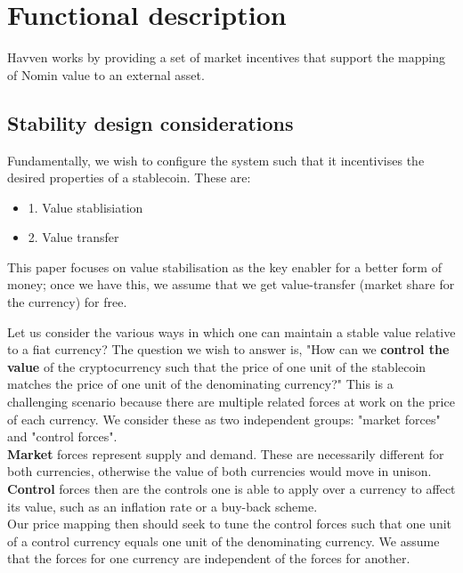 \section{Functional description}

Havven works by providing a set of market incentives that support the mapping of Nomin value to an external asset.

\subsection{Stability design considerations}

Fundamentally, we wish to configure the system such that it incentivises the desired properties of a stablecoin. These are:
\begin{itemize}
    \item 1. Value stablisiation
    \item 2. Value transfer
\end{itemize}

This paper focuses on value stabilisation as the key enabler for a better form of money; once we have this, we assume that we get value-transfer (market share for the currency) for free.


Let us consider the various ways in which one can maintain a stable value relative to a fiat currency? The question we wish to answer is, "How can we \textbf{control the value} of the cryptocurrency such that the price of one unit of the stablecoin matches the price of one unit of the denominating currency?" This is a challenging scenario because there are multiple related forces at work on the price of each currency. We consider these as two independent groups: "market forces" and "control forces". \\

\noindent \textbf{Market} forces represent supply and demand. These are necessarily different for both currencies, otherwise the value of both currencies would move in unison. \\

\noindent \textbf{Control} forces then are the controls one is able to apply over a currency to affect its value, such as an inflation rate or a buy-back scheme. \\

\noindent Our price mapping then should seek to tune the control forces such that one unit of a control currency equals one unit of the denominating currency. We assume that the forces for one currency are independent of the forces for another. \\

